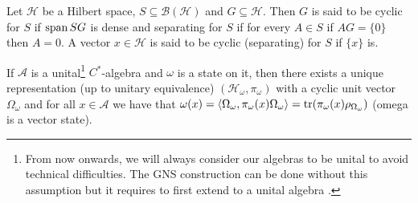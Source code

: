 \begin{definition}
Let $\mathcal{H}$ be a Hilbert space, $S\subseteq\mathcal{B}(\mathcal{H})$ and $G\subseteq\mathcal{H}$. Then $G$ is said to be cyclic for $S$ if $\operatorname{span} SG$ is dense and separating for $S$ if for every $A\in S$ if $AG=\{0\}$ then $A=0$. A vector $x\in\mathcal{H}$ is said to be cyclic (separating) for $S$ if $\{x\}$ is.
\end{definition}

\begin{theorem}
If $\mathcal{A}$ is a unital\footnote{From now onwards, we will always consider our algebras to be unital to avoid technical difficulties. The GNS construction can be done without this assumption but it requires to first extend to a unital algebra \cite{Bratteli1997}.} $C^*$-algebra and $\omega$ is a state on it, then there exists a unique representation (up to unitary equivalence) $(\mathcal{H}_\omega,\pi_\omega)$ with a cyclic unit vector $\Omega_\omega$ and for all $x\in\mathcal{A}$ we have that $\omega(x)=\langle\Omega_\omega,\pi_\omega(x)\Omega_\omega\rangle=\operatorname{tr}(\pi_\omega(x)\rho_{\Omega_\omega})$ (omega is a vector state).  
\end{theorem}

